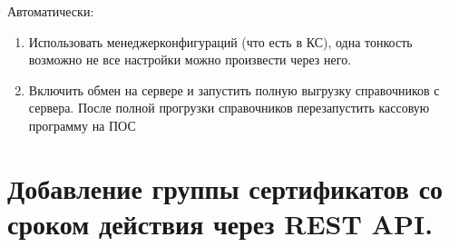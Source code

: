 \documentclass[letterpaper,10pt,russian]{sphinxmanual}
\begin{document}
\sphinxAtStartPar
Автоматически:
\begin{enumerate}
%
\item {} 
\sphinxAtStartPar
Использовать менеджер\sphinxhyphen{}конфигураций (что есть в КС), одна тонкость \sphinxhyphen{} возможно не все настройки можно произвести через него.

\item {} 
\sphinxAtStartPar
Включить обмен на сервере и запустить полную выгрузку справочников с сервера. После полной прогрузки справочников \sphinxhyphen{} перезапустить кассовую программу на ПОС

\end{enumerate}

\sphinxstepscope


\section{Добавление группы сертификатов со сроком действия через REST API.}
\label{\detokenize{sert:rest-api}}\label{\detokenize{sert::doc}}
\sphinxAtStartPar
{}
\end{document}

